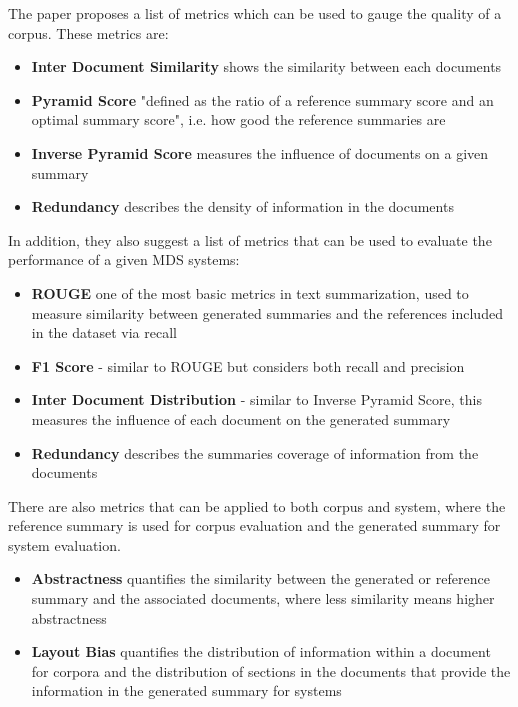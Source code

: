 \documentclass[20_original-paper.tex]{subfiles}
\begin{document}
The paper proposes a list of metrics which can be used to gauge the quality of a corpus. These metrics are:

\begin{itemize}
    \item \textbf{Inter Document Similarity} shows the similarity between each documents
    \item \textbf{Pyramid Score} "defined as the ratio of a reference summary score and an optimal summary score"\cite{dey-etal-2020-corpora},
          i.e. how good the reference summaries are
    \item \textbf{Inverse Pyramid Score} measures the influence of documents on a given summary
    \item \textbf{Redundancy} describes the density of information in the documents
\end{itemize}

In addition, they also suggest a list of metrics that can be used to evaluate the performance of a given MDS systems:

\begin{itemize}
    \item \textbf{ROUGE} one of the most basic metrics in text summarization,
          used to measure similarity between generated summaries and the references included in the dataset via recall
    \item \textbf{F1 Score} - similar to ROUGE but considers both recall and precision
    \item \textbf{Inter Document Distribution} - similar to Inverse Pyramid Score, this measures the influence of each document on the generated summary
    \item \textbf{Redundancy} describes the summaries coverage of information from the documents

\end{itemize}

There are also metrics that can be applied to both corpus and system, where the reference summary is used for corpus evaluation and the generated summary for system evaluation.

\begin{itemize}
    \item \textbf{Abstractness} quantifies the similarity between the generated or reference summary and the associated documents, where less similarity means higher abstractness
    \item \textbf{Layout Bias} quantifies the distribution of information within a document for corpora and the distribution of sections in the documents that provide the information in the generated summary for systems
\end{itemize}
\end{document}
